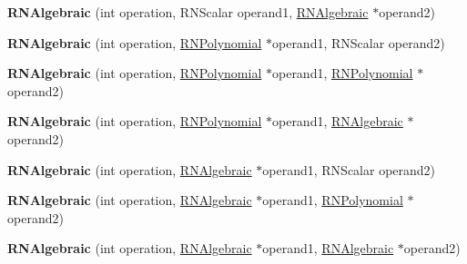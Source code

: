 \begin{DoxyCompactItemize}
\item 
{\bfseries R\+N\+Algebraic} (int operation, R\+N\+Scalar operand1, \hyperlink{class_r_n_algebraic}{R\+N\+Algebraic} $\ast$operand2)\hypertarget{class_r_n_algebraic_ad7c16fec4a8e35d93b4221e3b6ac0269}{}\label{class_r_n_algebraic_ad7c16fec4a8e35d93b4221e3b6ac0269}

\item 
{\bfseries R\+N\+Algebraic} (int operation, \hyperlink{class_r_n_polynomial}{R\+N\+Polynomial} $\ast$operand1, R\+N\+Scalar operand2)\hypertarget{class_r_n_algebraic_a433785d07a71053b3c5cf20f4014b67a}{}\label{class_r_n_algebraic_a433785d07a71053b3c5cf20f4014b67a}

\item 
{\bfseries R\+N\+Algebraic} (int operation, \hyperlink{class_r_n_polynomial}{R\+N\+Polynomial} $\ast$operand1, \hyperlink{class_r_n_polynomial}{R\+N\+Polynomial} $\ast$operand2)\hypertarget{class_r_n_algebraic_a2c5b9fbefd0ab7255cc895e07e325df5}{}\label{class_r_n_algebraic_a2c5b9fbefd0ab7255cc895e07e325df5}

\item 
{\bfseries R\+N\+Algebraic} (int operation, \hyperlink{class_r_n_polynomial}{R\+N\+Polynomial} $\ast$operand1, \hyperlink{class_r_n_algebraic}{R\+N\+Algebraic} $\ast$operand2)\hypertarget{class_r_n_algebraic_abc55f1a8a92ee480e2ee66fe919b15e1}{}\label{class_r_n_algebraic_abc55f1a8a92ee480e2ee66fe919b15e1}

\item 
{\bfseries R\+N\+Algebraic} (int operation, \hyperlink{class_r_n_algebraic}{R\+N\+Algebraic} $\ast$operand1, R\+N\+Scalar operand2)\hypertarget{class_r_n_algebraic_acd3f94eb837304abb6c3c5a9a5752a4f}{}\label{class_r_n_algebraic_acd3f94eb837304abb6c3c5a9a5752a4f}

\item 
{\bfseries R\+N\+Algebraic} (int operation, \hyperlink{class_r_n_algebraic}{R\+N\+Algebraic} $\ast$operand1, \hyperlink{class_r_n_polynomial}{R\+N\+Polynomial} $\ast$operand2)\hypertarget{class_r_n_algebraic_af920dd4259791104a143418646f69344}{}\label{class_r_n_algebraic_af920dd4259791104a143418646f69344}

\item 
{\bfseries R\+N\+Algebraic} (int operation, \hyperlink{class_r_n_algebraic}{R\+N\+Algebraic} $\ast$operand1, \hyperlink{class_r_n_algebraic}{R\+N\+Algebraic} $\ast$operand2)\hypertarget{class_r_n_algebraic_a0a83d0748b0bca4de640963797d73fdf}{}\label{class_r_n_algebraic_a0a83d0748b0bca4de640963797d73fdf}


\end{DoxyCompactItemize}
